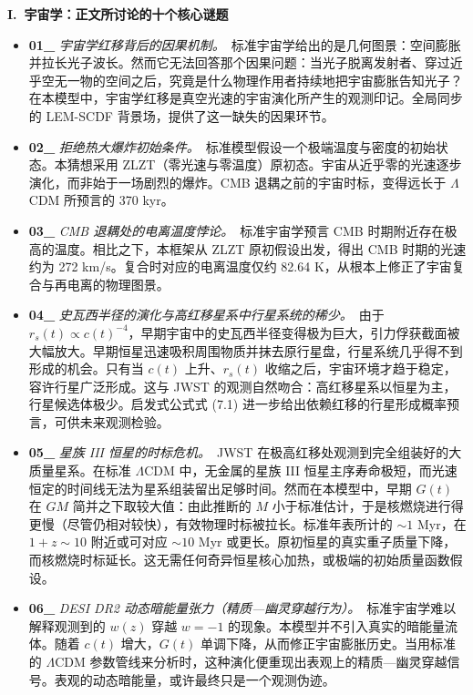 \documentclass[12pt,leqno]{article}
\begin{document}
			
	\medskip
	\bigskip
	\textbf{I.\ 宇宙学：正文所讨论的十个核心谜题}
	\begin{itemize}
		\item \textbf{01\_} \textit{宇宙学红移背后的因果机制。}\,\,\,标准宇宙学给出的是几何图景：空间膨胀并拉长光子波长。然而它无法回答那个因果问题：当光子脱离发射者、穿过近乎空无一物的空间之后，究竟是什么物理作用者持续地把宇宙膨胀告知光子？在本模型中，宇宙学红移是真空光速的宇宙演化所产生的观测印记。全局同步的 LEM-SCDF 背景场，提供了这一缺失的因果环节。
		
		\item \textbf{02\_} \textit{拒绝热大爆炸初始条件。}\,\,\,标准模型假设一个极端温度与密度的初始状态。本猜想采用 ZLZT（零光速与零温度）原初态。宇宙从近乎零的光速逐步演化，而非始于一场剧烈的爆炸。CMB 退耦之前的宇宙时标，变得远长于 $\Lambda$CDM 所预言的 370 kyr。
		
		\item \textbf{03\_} \textit{CMB 退耦处的电离温度悖论。}\,\,\,标准宇宙学预言 CMB 时期附近存在极高的温度。相比之下，本框架从 ZLZT 原初假设出发，得出 CMB 时期的光速约为 272 km/s。复合时对应的电离温度仅约 82.64 K，从根本上修正了宇宙复合与再电离的物理图景。
				
		\item \textbf{04\_} \textit{史瓦西半径的演化与高红移星系中行星系统的稀少。}\,\,\,由于 $r_s(t)\propto c(t)^{-4}$，早期宇宙中的史瓦西半径变得极为巨大，引力俘获截面被大幅放大。早期恒星迅速吸积周围物质并抹去原行星盘，行星系统几乎得不到形成的机会。只有当 $c(t)$ 上升、$r_s(t)$ 收缩之后，宇宙环境才趋于稳定，容许行星广泛形成。这与 JWST 的观测自然吻合：高红移星系以恒星为主，行星候选体极少。启发式公式式 (7.1) 进一步给出依赖红移的行星形成概率预言，可供未来观测检验。
		
		\item \textbf{05\_} \textit{星族 III 恒星的时标危机。}\,\,\,JWST 在极高红移处观测到完全组装好的大质量星系。在标准 $\Lambda$CDM 中，无金属的星族 III 恒星主序寿命极短，而光速恒定的时间线无法为星系组装留出足够时间。然而在本模型中，早期 $G(t)$ 在 $GM$ 简并之下取较大值：由此推断的 $M$ 小于标准估计，于是核燃烧进行得更慢（尽管仍相对较快），有效物理时标被拉长。标准年表所计的 $\sim 1$ Myr，在 $1+z \sim 10$ 附近或可对应 $\sim 10$ Myr 或更长。原初恒星的真实重子质量下降，而核燃烧时标延长。这无需任何奇异恒星核心加热，或极端的初始质量函数假设。
				
		\item \textbf{06\_} \textit{DESI DR2 动态暗能量张力（精质—幽灵穿越行为）。}\,\,\,标准宇宙学难以解释观测到的 $w(z)$ 穿越 $w=-1$ 的现象。本模型并不引入真实的暗能量流体。随着 $c(t)$ 增大，$G(t)$ 单调下降，从而修正宇宙膨胀历史。当用标准的 $\Lambda$CDM 参数管线来分析时，这种演化便重现出表观上的精质—幽灵穿越信号。表观的动态暗能量，或许最终只是一个观测伪迹。
		

\end{itemize}
\end{document}
